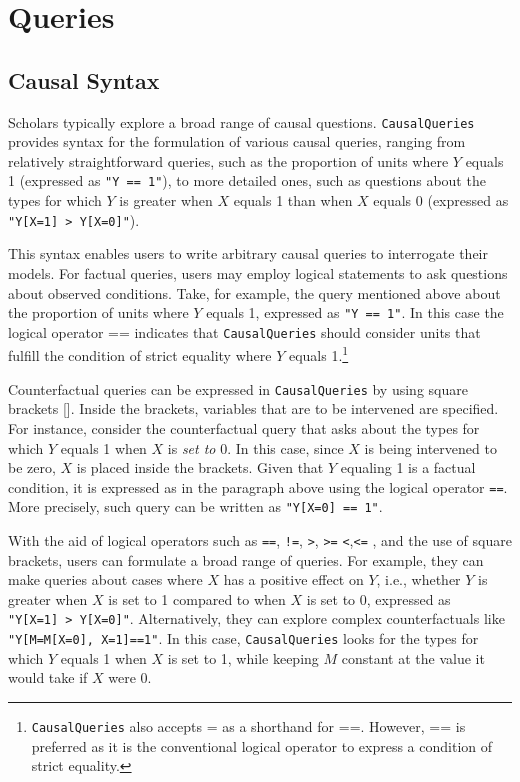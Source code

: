 \documentclass[
  11pt,
  article]{jss}
\begin{document}
\hypertarget{queries}{%
\section{Queries}\label{queries}}

\hypertarget{causal-syntax}{%
\subsection{Causal Syntax}\label{causal-syntax}}

Scholars typically explore a broad range of causal questions.
\texttt{CausalQueries} provides syntax for the formulation of various
causal queries, ranging from relatively straightforward queries, such as
the proportion of units where \(Y\) equals 1 (expressed as
\texttt{"Y\ ==\ 1"}), to more detailed ones, such as questions about the
types for which \(Y\) is greater when \(X\) equals 1 than when \(X\)
equals 0 (expressed as
\texttt{"Y{[}X=1{]}\ \textgreater{}\ Y{[}X=0{]}"}).

This syntax enables users to write arbitrary causal queries to
interrogate their models. For factual queries, users may employ logical
statements to ask questions about observed conditions. Take, for
example, the query mentioned above about the proportion of units where
\(Y\) equals 1, expressed as \texttt{"Y\ ==\ 1"}. In this case the
logical operator == indicates that \texttt{CausalQueries} should
consider units that fulfill the condition of strict equality where \(Y\)
equals 1.\footnote{\texttt{CausalQueries} also accepts = as a shorthand
  for ==. However, == is preferred as it is the conventional logical
  operator to express a condition of strict equality.}

Counterfactual queries can be expressed in \texttt{CausalQueries} by
using square brackets {[}{]}. Inside the brackets, variables that are to
be intervened are specified. For instance, consider the counterfactual
query that asks about the types for which \(Y\) equals 1 when \(X\) is
\emph{set to} 0. In this case, since \(X\) is being intervened to be
zero, \(X\) is placed inside the brackets. Given that \(Y\) equaling 1
is a factual condition, it is expressed as in the paragraph above using
the logical operator \texttt{==}. More precisely, such query can be
written as \texttt{"Y{[}X=0{]}\ ==\ 1"}.

With the aid of logical operators such as \texttt{==}, \texttt{!=},
\texttt{\textgreater{}}, \texttt{\textgreater{}=}
\texttt{\textless{}},\texttt{\textless{}=} , and the use of square
brackets, users can formulate a broad range of queries. For example,
they can make queries about cases where \(X\) has a positive effect on
\(Y\), i.e., whether \(Y\) is greater when \(X\) is set to 1 compared to
when \(X\) is set to 0, expressed as
\texttt{"Y{[}X=1{]}\ \textgreater{}\ Y{[}X=0{]}"}. Alternatively, they
can explore complex counterfactuals like
\texttt{"Y{[}M=M{[}X=0{]},\ X=1{]}==1"}. In this case,
\texttt{CausalQueries} looks for the types for which \(Y\) equals 1 when
\(X\) is set to 1, while keeping \(M\) constant at the value it would
take if \(X\) were 0.
\end{document}

